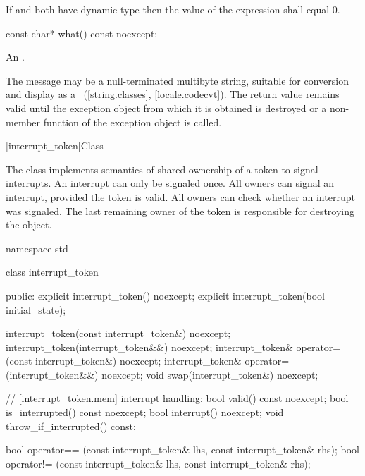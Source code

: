 {\begin{itemdescr}
  \pnum \postconditions If  and  both have dynamic type 
        then the value of the expression  shall equal 0.
\end{itemdescr}

%
\begin{itemdecl}
const char* what() const noexcept;
\end{itemdecl}

\begin{itemdescr}
\pnum
\returns
An  \ntbs{}.

\pnum
\remarks
The message may be a null-terminated multibyte string,
suitable for conversion and display as a
~(\ref{string.classes}, \ref{locale.codecvt}).
The return value remains valid until the exception object from which
it is obtained is destroyed or a non-
member function of the exception object is called.
\end{itemdescr}


%
[interrupt_token]{Class }

\pnum
{}%
The class  implements semantics of shared ownership of a 
token to signal interrupts.
An interrupt can only be signaled once.
All owners can signal an interrupt, provided the token is valid.
All owners can check whether an interrupt was signaled.
The last remaining owner of the token is responsible for destroying
the object.

\begin{codeblock}
namespace std {
  class interrupt_token {
  public:
    explicit interrupt_token() noexcept;
    explicit interrupt_token(bool initial_state);

    interrupt_token(const interrupt_token&) noexcept;
    interrupt_token(interrupt_token&&) noexcept;
    interrupt_token& operator=(const interrupt_token&) noexcept;
    interrupt_token& operator=(interrupt_token&&) noexcept;
    void swap(interrupt_token&) noexcept;

    // \ref{interrupt_token.mem} interrupt handling:
    bool valid() const noexcept;
    bool is_interrupted() const noexcept;
    bool interrupt() noexcept;
    void throw_if_interrupted() const;
  }
}

bool operator== (const interrupt_token& lhs, const interrupt_token& rhs);
bool operator!= (const interrupt_token& lhs, const interrupt_token& rhs);
\end{codeblock}

}

